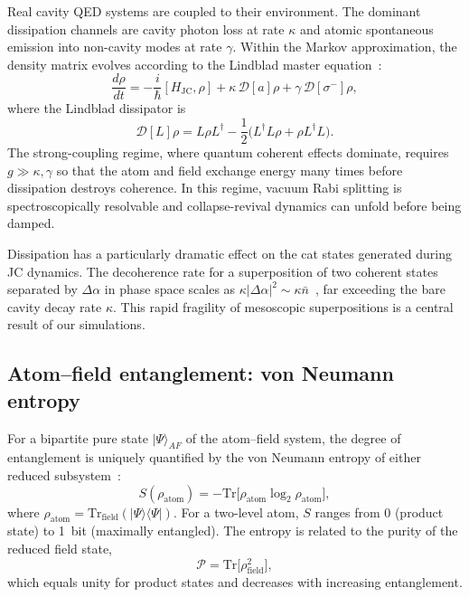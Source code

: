 \documentclass[%
 reprint,
 amsmath,amssymb,
 aps,
]{revtex4-2}
\begin{document}
Real cavity QED systems are coupled to their environment. The dominant dissipation channels are cavity photon loss at rate $\kappa$ and atomic spontaneous emission into non-cavity modes at rate $\gamma$. Within the Markov approximation, the density matrix evolves according to the Lindblad master equation~\cite{lindblad1976, wiseman2009}:
\begin{equation}
\frac{d\rho}{dt} = -\frac{i}{\hbar}[H_{\text{JC}}, \rho] + \kappa\, \mathcal{D}[a]\rho + \gamma\, \mathcal{D}[\sigma^-]\rho,
\label{eq:lindblad}
\end{equation}
where the Lindblad dissipator is
\begin{equation}
\mathcal{D}[L]\rho = L\rho L^\dagger - \frac{1}{2}\big(L^\dagger L \rho + \rho L^\dagger L\big).
\label{eq:dissipator}
\end{equation}
The strong-coupling regime, where quantum coherent effects dominate, requires $g \gg \kappa, \gamma$ so that the atom and field exchange energy many times before dissipation destroys coherence. In this regime, vacuum Rabi splitting is spectroscopically resolvable and collapse-revival dynamics can unfold before being damped.

Dissipation has a particularly dramatic effect on the cat states generated during JC dynamics. The decoherence rate for a superposition of two coherent states separated by $\Delta\alpha$ in phase space scales as $\kappa|\Delta\alpha|^2 \sim \kappa\bar{n}$~\cite{zurek2003}, far exceeding the bare cavity decay rate $\kappa$. This rapid fragility of mesoscopic superpositions is a central result of our simulations.


\subsection{Atom--field entanglement: von Neumann entropy}
\label{sec:entropy_theory}

For a bipartite pure state $|\Psi\rangle_{AF}$ of the atom--field system, the degree of entanglement is uniquely quantified by the von Neumann entropy of either reduced subsystem~\cite{nielsen2000}:
\begin{equation}
S(\rho_{\text{atom}}) = -\text{Tr}\big[\rho_{\text{atom}} \log_2 \rho_{\text{atom}}\big],
\label{eq:entropy}
\end{equation}
where $\rho_{\text{atom}} = \text{Tr}_{\text{field}}(|\Psi\rangle\langle\Psi|)$. For a two-level atom, $S$ ranges from 0 (product state) to 1~bit (maximally entangled). The entropy is related to the purity of the reduced field state,
\begin{equation}
\mathcal{P} = \text{Tr}\big[\rho_{\text{field}}^2\big],
\label{eq:purity}
\end{equation}
which equals unity for product states and decreases with increasing entanglement.
\end{document}
